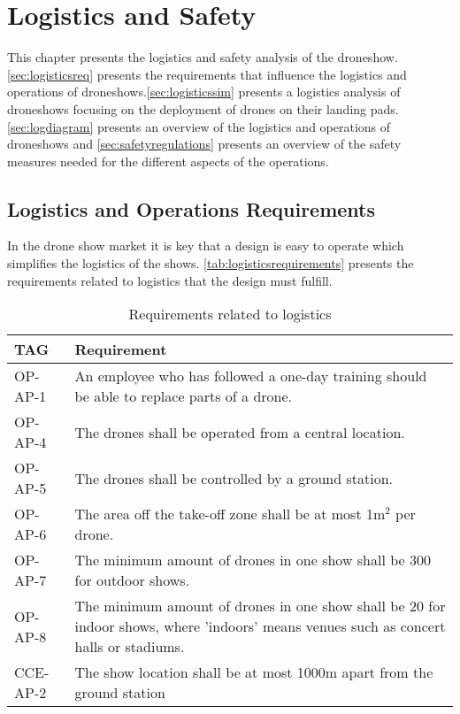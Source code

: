 \chapter{Logistics and Safety}
\label{ch:logistics}

This chapter presents the logistics and safety analysis of the droneshow. \autoref{sec:logisticsreq} presents the requirements that influence the logistics and operations of droneshows.\autoref{sec:logisticssim} presents a logistics analysis of droneshows focusing on the deployment of drones on their landing pads. \autoref{sec:logdiagram} presents an overview of the logistics and operations of droneshows and \autoref{sec:safetyregulations} presents an overview of the safety measures needed for the different aspects of the operations.

\section{Logistics and Operations Requirements} \label{sec:logisticsreq}

In the drone show market it is key that a design is easy to operate which simplifies the logistics of the shows. \autoref{tab:logisticsrequirements} presents the requirements related to logistics that the design must fulfill.

\begin{table}[H]
\centering
\caption{Requirements related to logistics}
\label{tab:logisticsrequirements}
\begin{small}
\begin{tabular}{|p{1.5cm}|p{13cm}|}
\hline
 \textbf{TAG} & \textbf{Requirement} \\ \hline
 OP-AP-1 & An employee who has followed a one-day training should be able to replace parts of a drone. \\ \hline
 OP-AP-4 & The drones shall be operated from a central location. \\ \hline 
 OP-AP-5 & The drones shall be controlled by a ground station. \\ \hline 
  OP-AP-6 & The area off the take-off zone shall be at most 1m$^2$ per drone. \\ \hline
  OP-AP-7 & The minimum amount of drones in one show shall be 300 for outdoor shows. \\ \hline
  OP-AP-8 & The minimum amount of drones in one show shall be 20 for indoor  shows, where ’indoors’ means venues such as concert halls or stadiums. \\ \hline
  CCE-AP-2 & The show location shall be at most 1000m apart from the ground station \\ \hline
 \end{tabular}
 \end{small}
 
\end{table}

